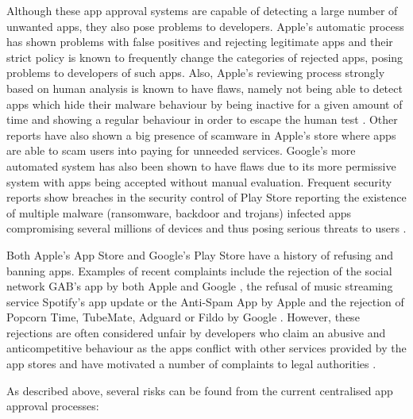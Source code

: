 \medskip

Although these app approval systems are capable of detecting a large number of unwanted apps, they also pose problems to developers. Apple's automatic process has shown problems with false positives and rejecting legitimate apps \cite{AppleInsiderWebsite} and their strict policy is known to frequently change the categories of rejected apps, posing problems to developers of such apps. Also, Apple's reviewing process strongly based on human analysis is known to have flaws, namely not being able to detect apps which hide their malware behaviour by being inactive for a given amount of time and showing a regular behaviour in order to escape the human test \cite{AppleFlaws1}. Other reports \cite{AppleFlaws2} have also shown a big presence of scamware in Apple's store where apps are able to scam users into paying for unneeded services. Google's more automated system has also been shown to have flaws \cite{AppleApprovalFortune} due to its more permissive system with apps being accepted without manual evaluation. Frequent security reports show breaches in the security control of Play Store reporting the existence of multiple malware (ransomware, backdoor and trojans) infected apps compromising several millions of devices and thus posing serious threats to users \cite{GoogleMalware1, GoogleMalware2, GoogleMalware3}.

\medskip

Both Apple's App Store and Google's Play Store have a history of refusing and banning apps. Examples of recent complaints include the rejection of the social network GAB's app by both Apple and Google \cite{AppRefusedGAB}, the refusal of music streaming service Spotify's app update \cite{AppleRefuseSpotify} or the Anti-Spam App \cite{AppleRefuseTRIAD} by Apple and the rejection of Popcorn Time, TubeMate, Adguard or Fildo by Google \cite{GoogleBannedApps}. However, these rejections are often considered unfair by developers who claim an abusive and anticompetitive behaviour as the apps conflict with other services provided by the app stores and have motivated a number of complaints to legal authorities \cite{AntiCompetitiveClaim}. \\

\medskip

As described above, several risks can be found from the current centralised app approval processes:

